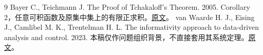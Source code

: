 \documentclass[UTF8,fontset=windows,11pt,a4paper]{ctexart}
\numberwithin{equation}{section}
\begin{document}
\begin{thebibliography}{9}
 Bayer C., Teichmann J. The Proof of Tchakaloff's Theorem. 2005. Corollary 2，任意可积函数及原集中集上的有限正求积。\href{https://arxiv.org/pdf/math/0502473}{原文}。
 van Waarde H. J., Eising J., Camlibel M. K., Trentelman H. L. The informativity approach to data-driven analysis and control. 2023. 本稿仅作问题组织背景，不直接套用其系统定理。\href{https://arxiv.org/pdf/2302.10488}{原文}。
\end{thebibliography}
\end{document}

